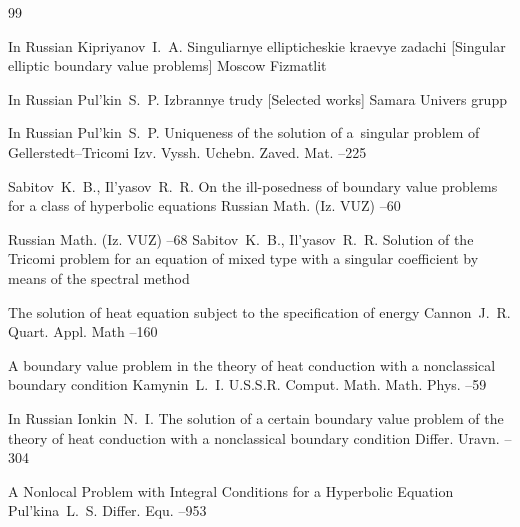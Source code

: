 \begin{thebibliography}{99}

\lang In Russian
\by Kipriyanov~I.~A.
\book Singuliarnye ellipticheskie kraevye zadachi \rm [Singular elliptic boundary value problems]
\publaddr Moscow
\publ Fizmatlit


\lang In Russian
\by Pul'kin~S.~P.
\book Izbrannye trudy \rm [Selected works]
\publaddr Samara
\publ Univers grupp

\lang In Russian
\by Pul'kin~S.~P.
\paper Uniqueness of the solution of a~singular problem of Gellerstedt--Tricomi
\jour Izv. Vyssh. Uchebn. Zaved. Mat.
--225

\by Sabitov~K.~B., Il'yasov~R.~R.
\paper On the ill-posedness of boundary value problems for a class of hyperbolic equations
\jour Russian Math. (Iz. VUZ)
--60


\jour Russian Math. (Iz. VUZ)
--68
\by Sabitov~K.~B., Il'yasov~R.~R.
\paper Solution of the Tricomi problem for an equation of mixed type with a singular coefficient by means of the spectral method

\paper The solution of heat equation subject to the specification of energy
\by Cannon~J.~R.
\jour Quart. Appl. Math
--160

\paper A boundary value problem in the theory of heat conduction with a nonclassical boundary condition
\by  Kamynin~L.~I.
\jour U.S.S.R. Comput. Math. Math. Phys.
--59

\lang In Russian
\by Ionkin~N.~I.
\paper The solution of a certain boundary value problem of the theory of heat conduction with a nonclassical boundary condition
\jour Differ. Uravn.
--304

\paper A Nonlocal Problem with Integral Conditions for a Hyperbolic Equation
\by  Pul'kina~L.~S.
\jour Differ. Equ.
--953


\end{thebibliography}
